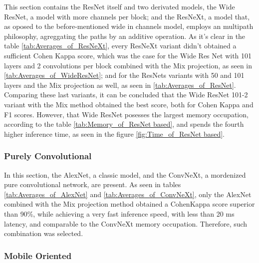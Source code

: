 This section contains the ResNet itself and two derivated models, the Wide ResNet, a model with more channels per block; and the ResNeXt, a model that, as oposed to the before-mentioned wide in channels model, employs an multipath philosophy, agreggating the paths by an additive operation. As it's clear in the table \ref{tab:Averages_of_ResNeXt}, every ResNeXt variant didn't obtained a sufficient Cohen Kappa score, which was the case for the Wide Res Net with 101 layers and 2 convolutions per block combined with the \acrshort{Mix} projection, as seen in \ref{tab:Averages_of_WideResNet}; and for the ResNets variants with 50 and 101 layers and the \acrshort{Mix} projection as well,  as seen in \ref{tab:Averages_of_ResNet}. Comparing these last variants, it can be concluded that the Wide ResNet 101-2 variant with the \acrshort{Mix} method obtained the best score, both for Cohen Kappa and F1 scores. However, that Wide ResNet posesses the largest memory occupation, according to the table \ref{tab:Memory_of_ResNet based}, and spends the fourth higher inference time, as seen in the figure \ref{fig:Time_of_ResNet based}. 

\pagebreak

\subsubsection{Purely Convolutional}







\pagebreak

In this section, the AlexNet, a classic model, and the ConvNeXt, a mordenized pure convolutional network, are present. As seen in tables \ref{tab:Averages_of_AlexNet} and \ref{tab:Averages_of_ConvNeXt}, only the AlexNet combined with the \acrshort{Mix} projection method obtained a CohenKappa score superior than 90\%, while achieving a very fast inference speed, with less than 20 ms latency, and comparable to the ConvNeXt memory occupation. Therefore, such combination was selected.  

\pagebreak

\subsubsection{Mobile Oriented}

